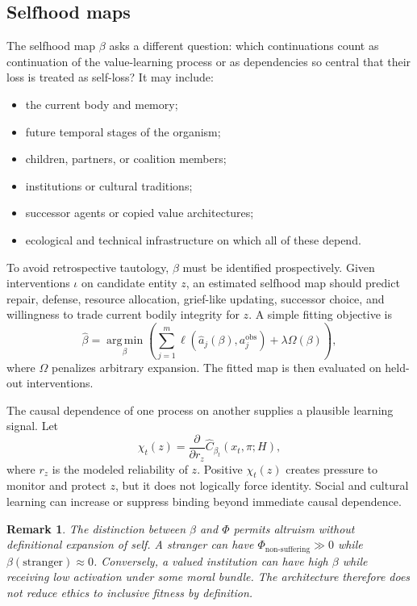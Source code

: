 \documentclass[11pt]{article}
\newtheorem{remark}{Remark}
\newcommand{\argmin}{\operatorname*{arg\,min}}
\begin{document}
\subsection{Selfhood maps}

The selfhood map $\beta$ asks a different question: which continuations count as continuation of the value-learning process or as dependencies so central that their loss is treated as self-loss? It may include:
\begin{itemize}
\item the current body and memory;
\item future temporal stages of the organism;
\item children, partners, or coalition members;
\item institutions or cultural traditions;
\item successor agents or copied value architectures;
\item ecological and technical infrastructure on which all of these depend.
\end{itemize}

To avoid retrospective tautology, $\beta$ must be identified prospectively. Given interventions $\iota$ on candidate entity $z$, an estimated selfhood map should predict repair, defense, resource allocation, grief-like updating, successor choice, and willingness to trade current bodily integrity for $z$. A simple fitting objective is
\begin{equation}
\widehat\beta
=
\argmin_{\beta}
\left(
\sum_{j=1}^m
\ell\!\left(
\widehat a_j(\beta),a_j^{\mathrm{obs}}
\right)
+\lambda\Omega(\beta)
\right),
\label{eq:beta-inference}
\end{equation}
where $\Omega$ penalizes arbitrary expansion. The fitted map is then evaluated on held-out interventions.

The causal dependence of one process on another supplies a plausible learning signal. Let
\begin{equation}
\chi_t(z)
=
\frac{\partial}{\partial r_z}
\widehat C_{\beta_t}(x_t,\pi;H),
\label{eq:dependency-score}
\end{equation}
where $r_z$ is the modeled reliability of $z$. Positive $\chi_t(z)$ creates pressure to monitor and protect $z$, but it does not logically force identity. Social and cultural learning can increase or suppress binding beyond immediate causal dependence.

\begin{remark}
The distinction between $\beta$ and $\Phi$ permits altruism without definitional expansion of self. A stranger can have $\Phi_{\text{non-suffering}}\gg0$ while $\beta(\text{stranger})\approx0$. Conversely, a valued institution can have high $\beta$ while receiving low activation under some moral bundle. The architecture therefore does not reduce ethics to inclusive fitness by definition.
\end{remark}
\end{document}
